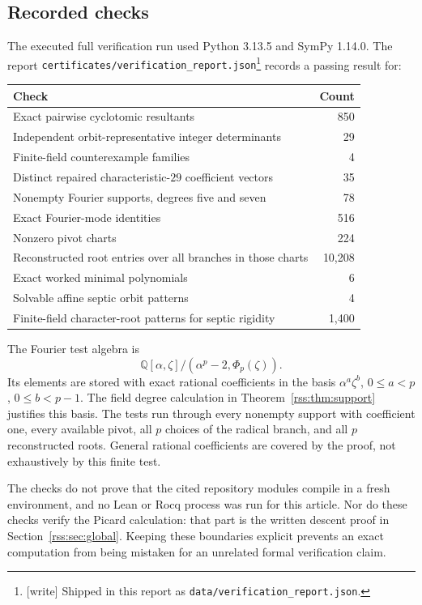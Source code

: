 \documentclass[11pt,a4paper]{article}
\theoremstyle{definition}
\theoremstyle{remark}
\newcommand{\Q}{\mathbb Q}
\newcommand{\code}[1]{{\small\nolinkurl{#1}}}
\begin{document}
\subsection{Recorded checks}

The executed full verification run used Python 3.13.5 and SymPy 1.14.0.
The report \code{certificates/verification_report.json}\footnote{[write]
Shipped in this report as \code{data/verification_report.json}.} records a passing
result for:
\begin{center}
\begin{tabular}{@{}lr@{}}
\toprule
Check & Count\\
\midrule
Exact pairwise cyclotomic resultants & 850\\
Independent orbit-representative integer determinants & 29\\
Finite-field counterexample families & 4\\
Distinct repaired characteristic-$29$ coefficient vectors & 35\\
Nonempty Fourier supports, degrees five and seven & 78\\
Exact Fourier-mode identities & 516\\
Nonzero pivot charts & 224\\
Reconstructed root entries over all branches in those charts & 10,208\\
Exact worked minimal polynomials & 6\\
Solvable affine septic orbit patterns & 4\\
Finite-field character-root patterns for septic rigidity & 1,400\\
\bottomrule
\end{tabular}
\end{center}

The Fourier test algebra is
\[
 \Q[\alpha,\zeta]/(\alpha^p-2,\Phi_p(\zeta)).
\]
Its elements are stored with exact rational coefficients in the basis
$\alpha^a\zeta^b$, $0\leq a<p$, $0\leq b<p-1$.
The field degree calculation in Theorem~\ref{rss:thm:support} justifies this
basis. The tests run through every nonempty support with coefficient one,
every available pivot, all $p$ choices of the radical branch, and all $p$
reconstructed roots. General rational coefficients are covered by the
proof, not exhaustively by this finite test.

The checks do not prove that the cited repository modules compile in a
fresh environment, and no Lean or Rocq process was run for this article.
Nor do these checks verify the Picard calculation: that part is the written
descent proof in Section~\ref{rss:sec:global}. Keeping these boundaries explicit
prevents an exact computation from being mistaken for an unrelated formal
verification claim.
\end{document}

